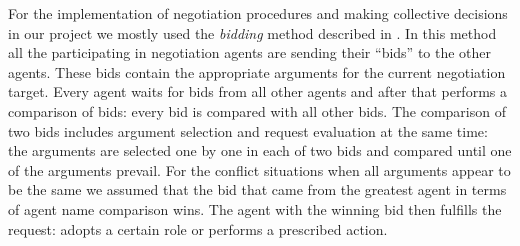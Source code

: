For the implementation of negotiation procedures and making collective decisions in our project we mostly used the \emph{bidding} method described in  \cite{bordini_programming_2007}. In this method all the participating in negotiation agents are sending their ``bids'' to the other agents. These bids contain the appropriate arguments for the current negotiation target. Every agent waits for bids from all other agents and after that performs a comparison of bids: every bid is compared with all other bids. The comparison of two bids includes argument selection and request evaluation at the same time: the arguments are selected one by one in each of two bids and compared until one of the arguments prevail. For the conflict situations when all arguments appear to be the same we assumed that the bid that came from the greatest agent in terms of agent name comparison wins. The agent with the winning bid then fulfills the request: adopts a certain role or performs a prescribed action. 